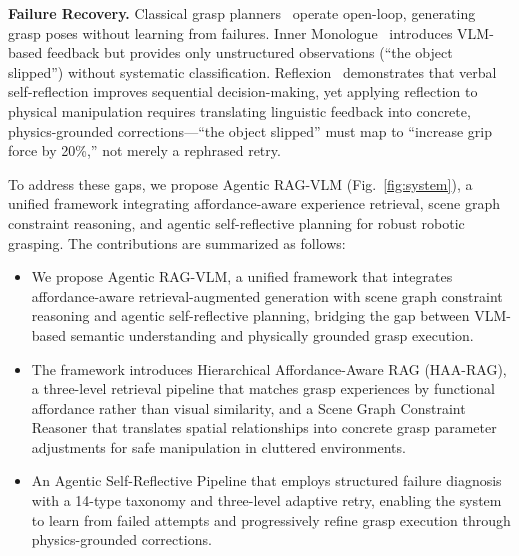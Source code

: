 \documentclass[letterpaper, 10pt, conference]{ieeeconf}
\newcommand{\sysname}{Agentic RAG-VLM}
\newcommand{\haarag}{HAA-RAG}
\begin{document}
\textbf{Failure Recovery.}
Classical grasp planners~\cite{kumra2020grconvnet, fang2023anygrasp, sundermeyer2021contact} operate open-loop, generating grasp poses without learning from failures.
Inner Monologue~\cite{huang2022inner} introduces VLM-based feedback but provides only unstructured observations (``the object slipped'') without systematic classification.
Reflexion~\cite{shinn2023reflexion} demonstrates that verbal self-reflection improves sequential decision-making, yet applying reflection to physical manipulation requires translating linguistic feedback into concrete, physics-grounded corrections---``the object slipped'' must map to ``increase grip force by 20\%,'' not merely a rephrased retry.

To address these gaps, we propose \sysname{} (Fig.~\ref{fig:system}), a unified framework integrating affordance-aware experience retrieval, scene graph constraint reasoning, and agentic self-reflective planning for robust robotic grasping.
The contributions are summarized as follows:
\begin{itemize}
    \item We propose \sysname{}, a unified framework that integrates affordance-aware retrieval-augmented generation with scene graph constraint reasoning and agentic self-reflective planning, bridging the gap between VLM-based semantic understanding and physically grounded grasp execution.
    
    \item The framework introduces Hierarchical Affordance-Aware RAG (\haarag{}), a three-level retrieval pipeline that matches grasp experiences by functional affordance rather than visual similarity, and a Scene Graph Constraint Reasoner that translates spatial relationships into concrete grasp parameter adjustments for safe manipulation in cluttered environments.
    
    \item An Agentic Self-Reflective Pipeline that employs structured failure diagnosis with a 14-type taxonomy and three-level adaptive retry, enabling the system to learn from failed attempts and progressively refine grasp execution through physics-grounded corrections.
\end{itemize}
\end{document}
